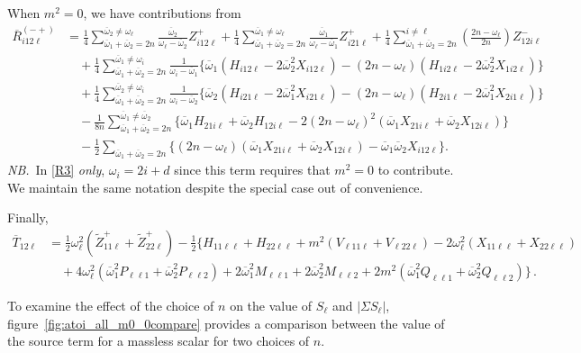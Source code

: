 \documentclass[letterpaper,11pt]{article}
\newcommand{\oi}{\omega_i}
\newcommand{\ol}{\omega_\ell}
\newcommand{\oone}{\overline{\omega}_1}
\newcommand{\otwo}{\overline{\omega}_2}
\begin{document}
When $m^2 = 0$, we have contributions from
\begin{align}
\label{R3}
\overline{R}_{i12\ell}^{(-+)} &=  \frac{1}{4} \sum_{\oone+\otwo = 2n}^{\otwo \neq \ol} \frac{\otwo}{\ol - \otwo} Z^+_{i12\ell} + \frac{1}{4} \sum_{\oone+\otwo = 2n}^{\oone \neq \ol} \frac{\oone}{\ol - \oone} Z^+_{i21\ell} + \frac{1}{4} \sum_{\oone+\otwo = 2n}^{i \neq \ell} \left( \frac{2n - \ol}{2n} \right) Z^-_{12i\ell} \nonumber \\
%
& \quad + \frac{1}{4} \sum_{\oone+\otwo = 2n}^{\oone \neq \oi} \frac{1}{\oi - \oone} \Big\{ \oone \left( H_{i12\ell} - 2\otwo^2 X_{i12\ell} \right) - (2n - \ol) \left( H_{1i2\ell} - 2\otwo^2 X_{1i2\ell} \right) \Big\} \nonumber \\
%
& \quad + \frac{1}{4} \sum_{\oone+\otwo = 2n}^{\otwo \neq \oi} \frac{1}{\oi - \otwo} \Big\{ \otwo \left( H_{i21\ell} - 2\oone^2 X_{i21\ell} \right) - (2n - \ol) \left( H_{2i1\ell} - 2\oone^2 X_{2i1\ell} \right) \Big\} \nonumber \\
%
& \quad - \frac{1}{8n} \sum_{\oone+\otwo = 2n}^{\oone \neq \otwo} \Big\{ \oone H_{21i\ell} + \otwo H_{12i\ell} - 2 \left( 2n - \ol \right)^2 \left(\oone X_{21i\ell} + \otwo X_{12i\ell} \right) \Big\} \nonumber \\
%
& \quad - \frac{1}{2} \sum_{\oone+\otwo = 2n} \Big\{ (2n - \ol) \left( \oone X_{21i\ell} + \otwo X_{12i\ell} \right) - \oone \otwo X_{i12\ell} \Big\} .
\end{align}
{\it NB.}\, In \eqref{R3} \emph{only}, $\oi = 2i + d$ since this term requires that $m^2 = 0$ to contribute. We maintain the same notation despite the special case out of convenience.

Finally, 
\begin{align}
\label{T12}
\overline{T}_{12\ell} &=  \frac{1}{2} \ol^2 \left( \tilde{Z}^+_{11\ell} + \tilde{Z}^+_{22\ell} \right)- \frac{1}{2} \Big\{ H_{11\ell\ell} + H_{22\ell\ell} + m^2 \left( V_{\ell 1 1 \ell} + V_{\ell 2 2 \ell} \right) - 2 \ol^2 \left( X_{11\ell\ell} + X_{22\ell\ell} \right)  \nonumber \\
%
& \quad + 4 \ol^2 \left( \oone^2 P_{\ell \ell 1} + \otwo^2 P_{\ell \ell 2} \right) + 2\oone^2 M_{\ell \ell 1} + 2\otwo^2 M_{\ell \ell 2} + 2m^2 \left( \oone^2 Q_{\ell\ell 1} + \otwo^2 Q_{\ell \ell 2} \right) \Big\} \, .
\end{align}

To examine the effect of the choice of $n$ on the value of $S_\ell$ and $| \Sigma S_\ell |$, figure~\ref{fig:atoi_all_m0_0compare} provides a comparison between the value of the source term for a massless scalar for two choices of $n$.
\end{document}
